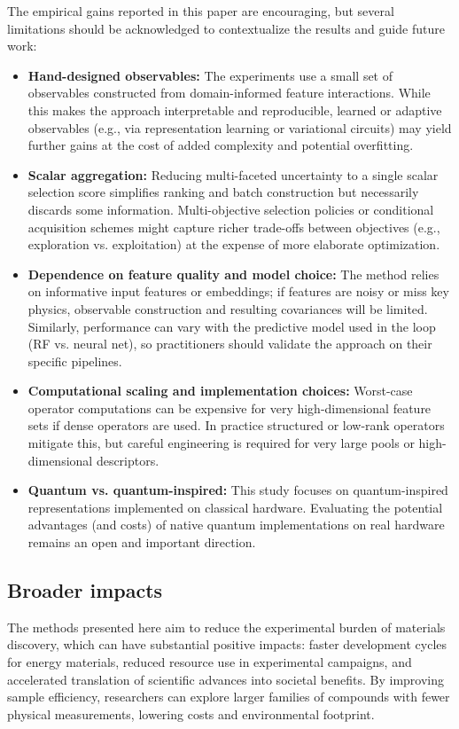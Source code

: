 \documentclass{article}
\begin{document}
The empirical gains reported in this paper are encouraging, but several limitations should be acknowledged to contextualize the results and guide future work:
\begin{itemize}
    \item \textbf{Hand-designed observables:} The experiments use a small set of observables constructed from domain-informed feature interactions. While this makes the approach interpretable and reproducible, learned or adaptive observables (e.g., via representation learning or variational circuits) may yield further gains at the cost of added complexity and potential overfitting.
    \item \textbf{Scalar aggregation:} Reducing multi-faceted uncertainty to a single scalar selection score simplifies ranking and batch construction but necessarily discards some information. Multi-objective selection policies or conditional acquisition schemes might capture richer trade-offs between objectives (e.g., exploration vs.
    exploitation) at the expense of more elaborate optimization.
    \item \textbf{Dependence on feature quality and model choice:} The method relies on informative input features or embeddings; if features are noisy or miss key physics, observable construction and resulting covariances will be limited. Similarly, performance can vary with the predictive model used in the loop (RF vs.
    neural net), so practitioners should validate the approach on their specific pipelines.
    \item \textbf{Computational scaling and implementation choices:} Worst-case operator computations can be expensive for very high-dimensional feature sets if dense operators are used. In practice structured or low-rank operators mitigate this, but careful engineering is required for very large pools or high-dimensional descriptors.
    \item \textbf{Quantum vs. quantum-inspired:} This study focuses on quantum-inspired representations implemented on classical hardware. Evaluating the potential advantages (and costs) of native quantum implementations on real hardware remains an open and important direction.
\end{itemize}

\subsection{Broader impacts}
\label{sec:broader}

The methods presented here aim to reduce the experimental burden of materials discovery, which can have substantial positive impacts: faster development cycles for energy materials, reduced resource use in experimental campaigns, and accelerated translation of scientific advances into societal benefits. By improving sample efficiency, researchers can explore larger families of compounds with fewer physical measurements, lowering costs and environmental footprint.
\end{document}
